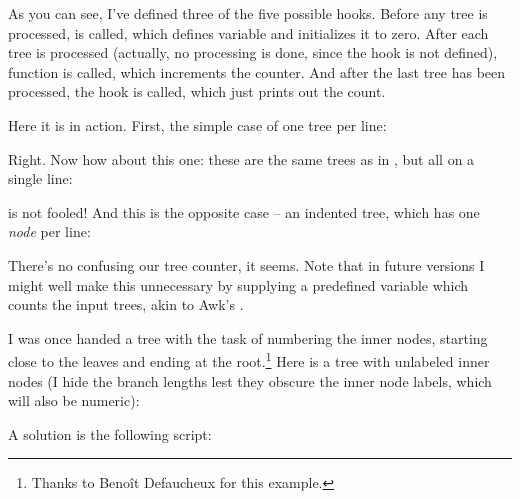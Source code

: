 \page[no]


As you can see, I've defined three of the five possible hooks. Before any tree
is processed,  is called, which defines variable
 and initializes it to zero. After each tree is processed
(actually, no processing is done, since the  hook is not defined),
function  is called, which increments the counter. And after
the last tree has been processed, the  hook is called, which
just prints out the count.

Here it is in action. First, the simple case of one tree per line:



Right. Now how about this one: these are the same trees as in
, but all on a single line:



\luaed{} is not fooled! And this is the opposite case -- an indented tree, which has one {\em node} per line:



There's no confusing our tree counter, it seems. Note that in future versions I
might well make this unnecessary by supplying a predefined variable which counts
the input trees, akin to Awk's .


I was once handed a tree with the task of numbering the inner nodes, starting
close to the leaves and ending at the root.\footnote{Thanks to Beno\^{i}t
Defaucheux for this example.} Here is a tree with unlabeled inner nodes (I hide
the branch lengths lest they obscure the inner node labels, which will also be
numeric):

\startalignment[center]
\externalfigure[ed_22_svg]
\stopalignment

A solution is the following \luaed{} script:


\startalignment[center]
\externalfigure[ed_21_svg]
\stopalignment 


